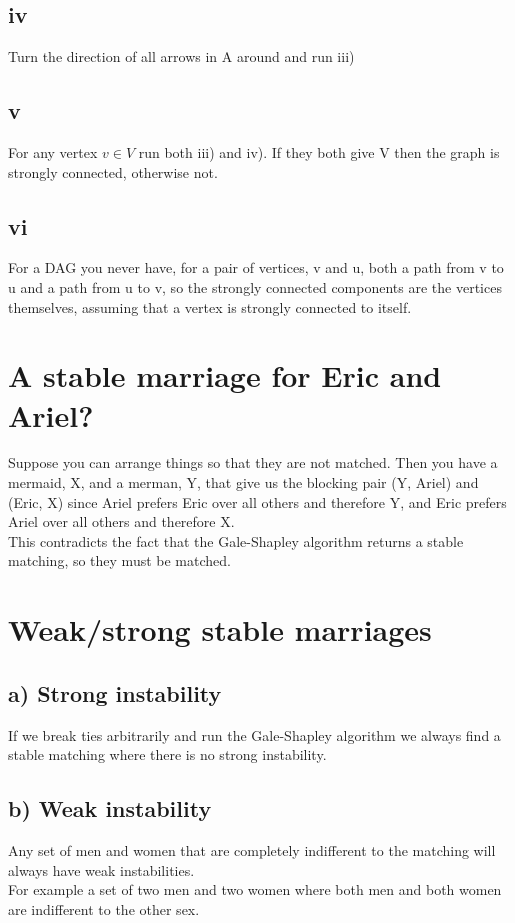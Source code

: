 \documentclass[a4paper]{article}
\begin{document}
\subsection*{iv}
Turn the direction of all arrows in A around and run iii)
\subsection*{v}
For any vertex $v \in V$ run both iii) and iv). If they both give V then the graph is strongly connected, otherwise not.
\subsection*{vi}
For a DAG you never have, for a pair of vertices, v and u, both a path from v to u and a path from u to v, so the strongly connected components are the vertices themselves, assuming that a vertex is strongly connected to itself.

\section{A stable marriage for Eric and Ariel?}
Suppose you can arrange things so that they are not matched. Then you have a mermaid, X, and a merman, Y, that give us the blocking pair (Y, Ariel) and (Eric, X) since Ariel prefers Eric over all others and therefore Y, and Eric prefers Ariel over all others and therefore X. \\
This contradicts the fact that the Gale-Shapley algorithm returns a stable matching, so they must be matched.

\section{Weak/strong stable marriages}
\subsection*{a) Strong instability}
If we break ties arbitrarily and run the Gale-Shapley algorithm we always find a stable matching where there is no strong instability. \\
\subsection*{b) Weak instability}
Any set of men and women that are completely indifferent to the matching will always have weak instabilities.\\
For example a set of two men and two women where both men and both women are indifferent to the other sex.
\end{document}
